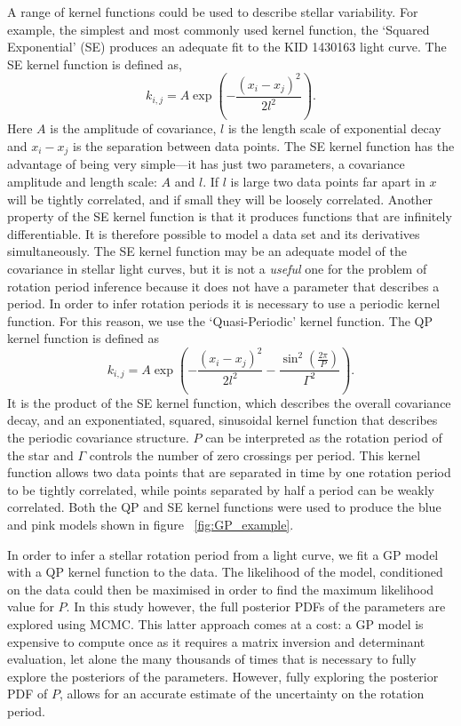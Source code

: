 A range of kernel functions could be used to describe stellar variability.
For example, the simplest and most commonly used kernel function, the `Squared
Exponential' (SE) produces an adequate fit to the KID 1430163 light curve.
The SE kernel function is defined as,
\begin{equation}
k_{i,j} = A \exp \left(-\frac{(x_i - x_j)^2}{2l^2} \right).
\end{equation}
\label{eq:SE}
Here $A$ is the amplitude of covariance, $l$ is the length scale of
exponential decay and $x_i-x_j$ is the separation between data points.
The SE kernel function has the advantage of being very simple---it has just
two parameters, a covariance amplitude and length scale: $A$ and $l$.
If $l$ is large two data points far apart in $x$ will be tightly correlated,
and if small they will be loosely correlated.
Another property of the SE kernel function is that it produces functions that
are infinitely differentiable.
It is therefore possible to model a data set and its derivatives
simultaneously.
The SE kernel function may be an adequate model of the covariance in stellar
light curves, but it is not a {\it useful} one for the problem of rotation
period inference because it does not have a parameter that describes a period.
In order to infer rotation periods it is necessary to use a periodic kernel
function.
For this reason, we use the `Quasi-Periodic' kernel function.
The QP kernel function is defined as
\begin{equation}
k_{i,j} = A \exp \left(-\frac{(x_i - x_j)^2}{2l^2} -
\frac{\sin^2(\frac{2\pi}{P})}{\Gamma^2} \right).
\end{equation}
\label{eq:QP}
It is the product of the SE kernel function, which describes the overall
covariance decay, and an exponentiated, squared, sinusoidal kernel function
that describes the periodic covariance structure.
$P$ can be interpreted as the rotation period of the star and $\Gamma$
controls the number of zero crossings per period.
This kernel function allows two data points that are separated in time by one
rotation period to be tightly correlated, while points separated by half a
period can be weakly correlated.
Both the QP and SE kernel functions were used to produce the blue and pink
models shown in figure ~\ref{fig:GP_example}.

In order to infer a stellar rotation period from a light curve, we fit a GP
model with a QP kernel function to the data.
The likelihood of the model, conditioned on the data could then be maximised
in order to find the maximum likelihood value for $P$.
In this study however, the full posterior PDFs of the parameters are explored
using MCMC.
This latter approach comes at a cost: a GP model is expensive to compute once
as it requires a matrix inversion and determinant evaluation, let alone the
many thousands of times that is necessary to fully explore the posteriors of
the parameters.
However, fully exploring the posterior PDF of $P$, allows for an accurate
estimate of the uncertainty on the rotation period.

